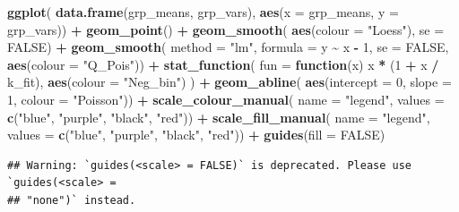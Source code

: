 \documentclass[
  12pt,
]{book}
\newenvironment{Shaded}{\begin{snugshade}}{\end{snugshade}}
\newcommand{\ControlFlowTok}[1]{\textcolor[rgb]{0.13,0.29,0.53}{\textbf{#1}}}
\newcommand{\DataTypeTok}[1]{\textcolor[rgb]{0.13,0.29,0.53}{#1}}
\newcommand{\DecValTok}[1]{\textcolor[rgb]{0.00,0.00,0.81}{#1}}
\newcommand{\KeywordTok}[1]{\textcolor[rgb]{0.13,0.29,0.53}{\textbf{#1}}}
\newcommand{\NormalTok}[1]{#1}
\newcommand{\OperatorTok}[1]{\textcolor[rgb]{0.81,0.36,0.00}{\textbf{#1}}}
\newcommand{\OtherTok}[1]{\textcolor[rgb]{0.56,0.35,0.01}{#1}}
\newcommand{\StringTok}[1]{\textcolor[rgb]{0.31,0.60,0.02}{#1}}
\begin{document}
\begin{Shaded}
\begin{Highlighting}[]
\KeywordTok{ggplot}\NormalTok{(}
  \KeywordTok{data.frame}\NormalTok{(grp\_means, grp\_vars),}
  \KeywordTok{aes}\NormalTok{(}\DataTypeTok{x =}\NormalTok{ grp\_means, }\DataTypeTok{y =}\NormalTok{ grp\_vars)) }\OperatorTok{+}
\StringTok{  }\KeywordTok{geom\_point}\NormalTok{() }\OperatorTok{+}
\StringTok{  }\KeywordTok{geom\_smooth}\NormalTok{(}
    \KeywordTok{aes}\NormalTok{(}\DataTypeTok{colour =} \StringTok{"Loess"}\NormalTok{), }\DataTypeTok{se =} \OtherTok{FALSE}\NormalTok{) }\OperatorTok{+}
\StringTok{  }\KeywordTok{geom\_smooth}\NormalTok{(}
    \DataTypeTok{method =} \StringTok{"lm"}\NormalTok{, }\DataTypeTok{formula =}\NormalTok{ y }\OperatorTok{\textasciitilde{}}\StringTok{ }\NormalTok{x }\OperatorTok{{-}}\StringTok{ }\DecValTok{1}\NormalTok{, }\DataTypeTok{se =} \OtherTok{FALSE}\NormalTok{,}
    \KeywordTok{aes}\NormalTok{(}\DataTypeTok{colour =} \StringTok{"Q\_Pois"}\NormalTok{)) }\OperatorTok{+}
\StringTok{  }\KeywordTok{stat\_function}\NormalTok{(}
    \DataTypeTok{fun =} \ControlFlowTok{function}\NormalTok{(x) x }\OperatorTok{*}\StringTok{ }\NormalTok{(}\DecValTok{1} \OperatorTok{+}\StringTok{ }\NormalTok{x }\OperatorTok{/}\StringTok{ }\NormalTok{k\_fit),}
    \KeywordTok{aes}\NormalTok{(}\DataTypeTok{colour =} \StringTok{"Neg\_bin"}\NormalTok{)}
\NormalTok{  ) }\OperatorTok{+}
\StringTok{  }\KeywordTok{geom\_abline}\NormalTok{(}
    \KeywordTok{aes}\NormalTok{(}\DataTypeTok{intercept =} \DecValTok{0}\NormalTok{, }\DataTypeTok{slope =} \DecValTok{1}\NormalTok{, }\DataTypeTok{colour =} \StringTok{"Poisson"}\NormalTok{)) }\OperatorTok{+}
\StringTok{  }\KeywordTok{scale\_colour\_manual}\NormalTok{(}
    \DataTypeTok{name =} \StringTok{"legend"}\NormalTok{,}
    \DataTypeTok{values =} \KeywordTok{c}\NormalTok{(}\StringTok{"blue"}\NormalTok{, }\StringTok{"purple"}\NormalTok{, }\StringTok{"black"}\NormalTok{, }\StringTok{"red"}\NormalTok{)) }\OperatorTok{+}
\StringTok{  }\KeywordTok{scale\_fill\_manual}\NormalTok{(}
    \DataTypeTok{name =} \StringTok{"legend"}\NormalTok{,}
    \DataTypeTok{values =} \KeywordTok{c}\NormalTok{(}\StringTok{"blue"}\NormalTok{, }\StringTok{"purple"}\NormalTok{, }\StringTok{"black"}\NormalTok{, }\StringTok{"red"}\NormalTok{)) }\OperatorTok{+}
\StringTok{  }\KeywordTok{guides}\NormalTok{(}\DataTypeTok{fill =} \OtherTok{FALSE}\NormalTok{)}
\end{Highlighting}
\end{Shaded}

\begin{verbatim}
## Warning: `guides(<scale> = FALSE)` is deprecated. Please use `guides(<scale> =
## "none")` instead.
\end{verbatim}
\end{document}
